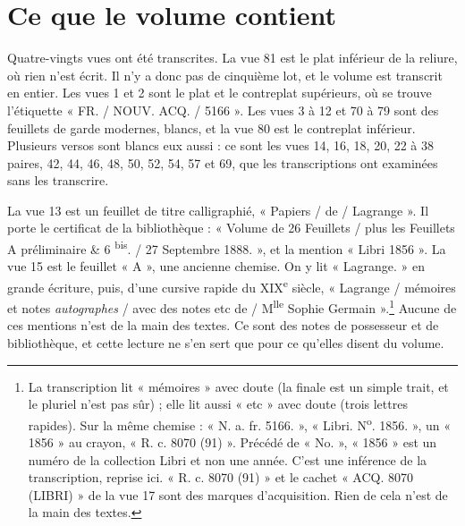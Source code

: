 \documentclass[11pt,a4paper]{article}
\begin{document}
\begin{resume}
\end{resume}

\section*{Ce que le volume contient}

Quatre-vingts vues ont été transcrites. La vue 81 est le plat inférieur de la
reliure, où rien n'est écrit. Il n'y a donc pas de cinquième lot, et le volume
est transcrit en entier. Les vues 1 et 2 sont le plat et le contreplat
supérieurs, où se trouve l'étiquette « FR. / NOUV. ACQ. / 5166 ». Les vues 3 à
12 et 70 à 79 sont des feuillets de garde modernes, blancs, et la vue 80 est le
contreplat inférieur. Plusieurs versos sont blancs eux aussi : ce sont les vues
14, 16, 18, 20, 22 à 38 paires, 42, 44, 46, 48, 50, 52, 54, 57 et 69, que les
transcriptions ont examinées sans les transcrire.

La vue 13 est un feuillet de titre calligraphié, « Papiers / de / Lagrange ».
Il porte le certificat de la bibliothèque : « Volume de 26 Feuillets / plus les
Feuillets A préliminaire \& 6 \textsuperscript{bis}. / 27 Septembre 1888. », et
la mention « Libri 1856 ». La vue 15 est le feuillet « A », une ancienne chemise.
On y lit « Lagrange. » en grande écriture, puis, d'une cursive rapide du
XIX\textsuperscript{e} siècle, « Lagrange / mémoires et notes \emph{autographes} /
avec des notes etc de / M\textsuperscript{lle} Sophie Germain ».\footnote{La
transcription lit « mémoires » avec doute (la finale est un simple trait, et
le pluriel n'est pas sûr) ; elle lit aussi « etc » avec doute (trois lettres
rapides). Sur la même chemise : « N. a. fr. 5166. », « Libri. N\textsuperscript{o}.
1856. », un « 1856 » au crayon, « R. c. 8070 (91) ». Précédé de « No. »,
« 1856 » est un numéro de la collection Libri et non une année. C'est une
inférence de la transcription, reprise ici. « R. c. 8070 (91) » et le cachet
« ACQ. 8070 (LIBRI) » de la vue 17 sont des marques d'acquisition. Rien de cela
n'est de la main des textes.} Aucune de ces mentions n'est de la main des
textes. Ce sont des notes de possesseur et de bibliothèque, et cette lecture
ne s'en sert que pour ce qu'elles disent du volume.
\end{document}

